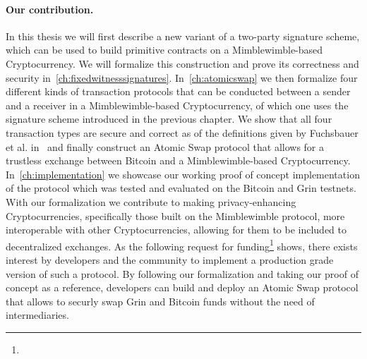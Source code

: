 \paragraph{Our contribution.} In this thesis we will first describe a new variant of a two-party signature scheme, which can be used to build primitive contracts on a Mimblewimble-based Cryptocurrency.
We will formalize this construction and prove its correctness and security in~\cref{ch:fixedwitnesssignatures}.
In~\cref{ch:atomicswap} we then formalize four different kinds of transaction protocols that can be conducted between a sender and a receiver in a Mimblewimble-based Cryptocurrency, of which one uses the signature scheme introduced in the previous chapter.
We show that all four transaction types are secure and correct as of the definitions given by Fuchsbauer et al. in~\cite{fuchsbauer2019aggregate} and finally construct an Atomic Swap protocol that allows for a trustless exchange between Bitcoin and a Mimblewimble-based Cryptocurrency.
In~\cref{ch:implementation} we showcase our working proof of concept implementation of the protocol which was tested and evaluated on the Bitcoin and Grin testnets.\\
With our formalization we contribute to making privacy-enhancing Cryptocurrencies, specifically those built on the Mimblewimble protocol, more interoperable with other Cryptocurrencies, allowing for them to be included to decentralized exchanges.
As the following request for funding\footnote{\urlgrinfund} shows, there exists interest by developers and the community to implement a production grade version of such a protocol.
By following our formalization and taking our proof of concept as a reference, developers can build and deploy an Atomic Swap protocol that allows to securly swap Grin and Bitcoin funds without the need of intermediaries.